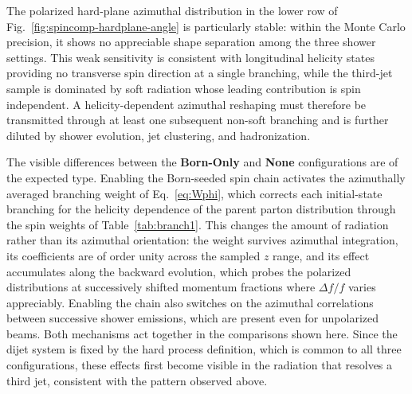\documentclass[a4paper,11pt]{article}
\begin{document}
The polarized hard-plane azimuthal distribution in the lower row of
Fig.~\ref{fig:spincomp-hardplane-angle} is particularly stable: within the
Monte Carlo precision, it shows no appreciable shape separation among the
three shower settings. This weak sensitivity is consistent with longitudinal
helicity states providing no transverse spin direction at a single branching,
while the third-jet sample is dominated by soft radiation whose leading
contribution is spin independent. A helicity-dependent azimuthal reshaping must
therefore be transmitted through at least one subsequent non-soft branching
and is further diluted by shower evolution, jet clustering, and hadronization.

The visible differences between the \textbf{Born-Only} and \textbf{None}
configurations are of the expected type. Enabling the Born-seeded
spin chain activates the azimuthally averaged branching weight of
Eq.~\eqref{eq:Wphi}, which corrects each initial-state branching for the
helicity dependence of the parent parton distribution through the spin
weights of Table~\ref{tab:branch1}. This changes the amount of radiation
rather than its azimuthal orientation: the weight survives azimuthal
integration, its
coefficients are of order unity across the sampled $z$ range, and its
effect accumulates along the backward evolution, which probes the
polarized distributions at successively shifted momentum fractions where
$\Delta f/f$ varies appreciably. Enabling the chain also switches on the
azimuthal correlations between successive shower emissions, which are
present even for unpolarized beams. Both mechanisms act together in the
comparisons shown here. Since the dijet system is fixed by the hard
process definition, which is common to all three configurations, these effects
first become visible in the radiation that resolves a third jet, consistent
with the pattern observed above.
\end{document}
